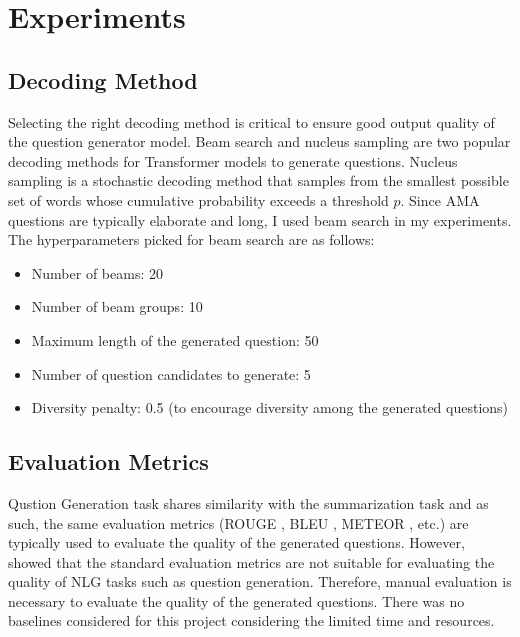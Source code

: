 \documentclass[paper=a4, fontsize=11pt]{scrartcl}
\numberwithin{equation}{section}		%
\numberwithin{figure}{section}			%
\numberwithin{table}{section}				%
\begin{document}
\section{Experiments}
\subsection*{Decoding Method}
Selecting the right decoding method is critical to ensure good output quality of the question generator model.
Beam search and nucleus sampling are two popular decoding methods for Transformer models to generate questions.
Nucleus sampling is a stochastic decoding method that samples from the smallest possible set of words whose cumulative probability exceeds a threshold $p$.
Since AMA questions are typically elaborate and long, I used beam search in my experiments.
The hyperparameters picked for beam search are as follows:

\begin{itemize}
  \setlength\itemsep{0.1em}
  \small
  \item Number of beams: 20
  \item Number of beam groups: 10
  \item Maximum length of the generated question: 50
  \item Number of question candidates to generate: 5
  \item Diversity penalty: 0.5 (to encourage diversity among the generated questions)
\end{itemize}

\subsection*{Evaluation Metrics}
Qustion Generation task shares similarity with the summarization task and as such, the same evaluation metrics (ROUGE \cite{lin2004rouge}, BLEU \cite{papineni2002bleu}, METEOR \cite{banerjee2005meteor}, etc.) are typically used to evaluate the quality of the generated questions.
However, \cite{novikova2017we} showed that the standard evaluation metrics are not suitable for evaluating the quality of NLG tasks such as question generation.
Therefore, manual evaluation is necessary to evaluate the quality of the generated questions.
There was no baselines considered for this project considering the limited time and resources.
\end{document}
